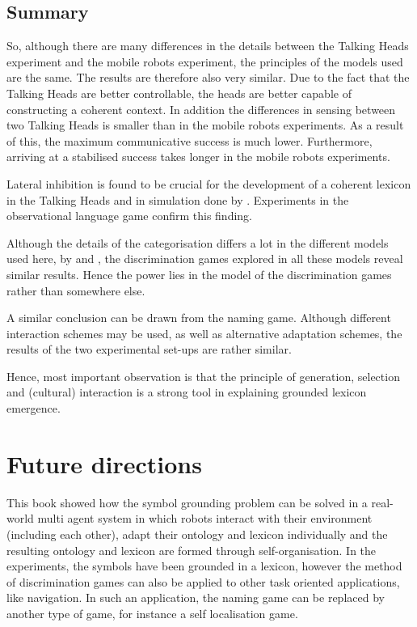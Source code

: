 \subsection{Summary}

So, although there are many differences in the details between the Talking Heads experiment and the mobile robots experiment, the principles of the models used are the same. The results are therefore also very similar. Due to the fact that the Talking Heads are better controllable, the heads are better capable of constructing a coherent context. In addition the differences in sensing between two Talking Heads is smaller than in the mobile robots experiments. As a result of this, the maximum communicative success is much lower. Furthermore, arriving at a stabilised success takes longer in the mobile robots experiments. 

Lateral inhibition is found to be crucial for the development of a coherent lexicon in the Talking Heads \citep{steels:2000,kaplan:2000} and in simulation done by \citet{dejong:2000}. Experiments in the observational language game confirm this finding. 

Although the details of the categorisation differs a lot in the different models used here, by \citet{steels:2000} and \citet{dejong:2000}, the discrimination games explored in all these models reveal similar results. Hence the power lies in the model of the discrimination games rather than somewhere else.

A similar conclusion can be drawn from the naming game. Although different interaction schemes may be used, as well as alternative adaptation schemes, the results of the two experimental set-ups are rather similar. 

Hence, most important observation is that the principle of generation, selection and (cultural) interaction is a strong tool in explaining grounded lexicon emergence.

\section{Future directions}

This book showed how the symbol grounding problem can be solved in a real-world multi agent system in which robots interact with their environment (including each other), adapt their ontology and lexicon individually and the resulting ontology and lexicon are formed through self-organisation. In the experiments, the symbols have been grounded in a lexicon, however the method of discrimination games can also be applied to other task oriented applications, like navigation. In such an application, the naming game can be replaced by another type of game, for instance a {\sc self localisation game}.

